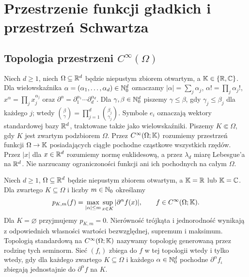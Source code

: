 
\section{Przestrzenie funkcji gładkich i przestrzeń Schwartza}
\label{sec:gladkie-schwartz17}

\providecommand{\atlasref}[2]{#2}


\subsection{Topologia przestrzeni \texorpdfstring{$C^\infty(\Omega)$}{Cinfty(Omega)}}

Niech $d\ge1$, niech $\Omega\subseteq\mathbb R^d$ będzie niepustym zbiorem
otwartym, a $\mathbb K\in\{\mathbb R,\mathbb C\}$. Dla wielowskaźnika
$\alpha=(\alpha_1,\dots,\alpha_d)\in\mathbb N_0^d$ oznaczamy
$|\alpha|=\sum_j\alpha_j$, $\alpha!=\prod_j\alpha_j!$,
$x^\alpha=\prod_jx_j^{\alpha_j}$ oraz
$\partial^\alpha=\partial_1^{\alpha_1}\cdots\partial_d^{\alpha_d}$.
Dla $\gamma,\beta\in\mathbb N_0^d$ piszemy $\gamma\le\beta$,
gdy $\gamma_j\le\beta_j$ dla każdego $j$;
wtedy $\binom{\beta}{\gamma}=\prod_{j=1}^d\binom{\beta_j}{\gamma_j}$.
Symbole $e_i$ oznaczają wektory standardowej bazy $\mathbb R^d$,
traktowane także jako wielowskaźniki. Piszemy $K\Subset\Omega$,
gdy $K$ jest zwartym podzbiorem $\Omega$.
Przez $C^\infty(\Omega;\mathbb K)$ rozumiemy przestrzeń funkcji
$\Omega\to\mathbb K$ posiadających ciągłe pochodne cząstkowe wszystkich rzędów.
Przez $|x|$ dla $x\in\mathbb R^d$ rozumiemy normę euklidesową,
a przez $\lambda_d$ miarę Lebesgue'a na $\mathbb R^d$.
Nie narzucamy ograniczoności funkcji ani ich pochodnych na całym $\Omega$.

\begin{definicja}
\label{def:seminormy-cinf17}
Niech $d\ge1$, $\Omega\subseteq\mathbb R^d$ będzie niepustym zbiorem
otwartym, a $\mathbb K=\mathbb R$ lub $\mathbb K=\mathbb C$.
Dla zwartego $K\subseteq\Omega$ i liczby $m\in\mathbb N_0$ określamy
\[
 p_{K,m}(f)=\max_{|\alpha|\le m}\sup_{x\in K}|\partial^\alpha f(x)|,
 \qquad f\in C^\infty(\Omega;\mathbb K).
\]
Dla $K=\varnothing$ przyjmujemy $p_{K,m}=0$.
Nierówność trójkąta i jednorodność wynikają z odpowiednich
własności wartości bezwzględnej, supremum i maksimum.
Topologią standardową na $C^\infty(\Omega;\mathbb K)$ nazywamy
topologię generowaną przez rodzinę tych seminorm.
Sieć $(f_\iota)$ zbiega do $f$ w tej topologii wtedy i tylko wtedy,
gdy dla każdego zwartego $K\subseteq\Omega$ i każdego
$\alpha\in\mathbb N_0^d$ pochodne $\partial^\alpha f_\iota$
zbiegają jednostajnie do $\partial^\alpha f$ na $K$.
\end{definicja}


